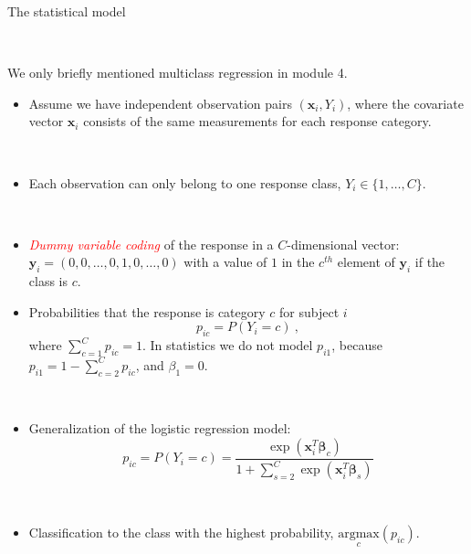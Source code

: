 \documentclass[10pt,ignorenonframetext,]{beamer}
\providecommand{\tightlist}{%
  \setlength{\itemsep}{0pt}\setlength{\parskip}{0pt}}
\begin{document}
\begin{frame}

\begin{block}{The statistical model}

\(~\)

We only briefly mentioned multiclass regression in module 4.

\vspace{4mm}

\begin{itemize}
\tightlist
\item
  Assume we have independent observation pairs
  \(({\boldsymbol x}_i, Y_i)\), where the covariate vector
  \({\boldsymbol x}_i\) consists of the same measurements for each
  response category.
\end{itemize}

\(~\)

\begin{itemize}
\tightlist
\item
  Each observation can only belong to one response class,
  \(Y_i \in \{1, \ldots ,C\}\).
\end{itemize}

\(~\)

\begin{itemize}
\tightlist
\item
  \emph{\textcolor{red}{Dummy variable coding}} of the response in a
  \(C\)-dimensional vector:
  \({\boldsymbol y}_i=(0,0,\ldots,0,1,0,\ldots,0)\) with a value of
  \(1\) in the \(c^{th}\) element of \({\boldsymbol y}_i\) if the class
  is \(c\).
\end{itemize}

\end{block}

\end{frame}

\begin{frame}

\begin{itemize}
\tightlist
\item
  Probabilities that the response is category \(c\) for subject \(i\)
  \[p_{ic}=P(Y_i=c)  \ ,\] where \(\sum_{c=1}^C p_{ic}=1\). In
  statistics we do not model \(p_{i1}\), because
  \(p_{i1}=1-\sum_{c=2}^{C} p_{ic}\), and \(\beta_1=0\).
\end{itemize}

\(~\)

\begin{itemize}
\tightlist
\item
  Generalization of the logistic regression model:
  \[p_{ic}=P(Y_i=c)= \frac{\exp({\boldsymbol x}_i^T{\boldsymbol \beta}_c)}{1+\sum_{s=2}^{C}\exp({\boldsymbol x}_i^T{\boldsymbol \beta}_s)}\]
\end{itemize}

\(~\)

\begin{itemize}
\tightlist
\item
  Classification to the class with the highest probability,
  \(\underset{c}{\text{argmax}}(p_{ic})\).
\end{itemize}

\end{frame}
\end{document}
